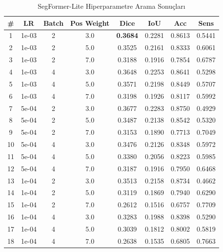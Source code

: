 \begin{table}[htbp]
\centering
\caption{SegFormer-Lite Hiperparametre Arama Sonuçları}
\label{tab:hyperparam_segformer}
\begin{tabular}{cccccccc}
\hline
\textbf{\#} & \textbf{LR} & \textbf{Batch} & \textbf{Pos Weight} & \textbf{Dice} & \textbf{IoU} & \textbf{Acc} & \textbf{Sens} \\
\hline
1 & 1e-03 & 2 & 3.0 & \textbf{0.3684} & 0.2281 & 0.8613 & 0.5441 \\
2 & 1e-03 & 2 & 5.0 & 0.3525 & 0.2161 & 0.8333 & 0.6061 \\
3 & 1e-03 & 2 & 7.0 & 0.3188 & 0.1916 & 0.7854 & 0.6787 \\
4 & 1e-03 & 4 & 3.0 & 0.3648 & 0.2253 & 0.8641 & 0.5298 \\
5 & 1e-03 & 4 & 5.0 & 0.3571 & 0.2198 & 0.8449 & 0.5707 \\
6 & 1e-03 & 4 & 7.0 & 0.3198 & 0.1926 & 0.8117 & 0.5992 \\
7 & 5e-04 & 2 & 3.0 & 0.3677 & 0.2283 & 0.8750 & 0.4929 \\
8 & 5e-04 & 2 & 5.0 & 0.3487 & 0.2138 & 0.8542 & 0.5320 \\
9 & 5e-04 & 2 & 7.0 & 0.3153 & 0.1890 & 0.7713 & 0.7049 \\
10 & 5e-04 & 4 & 3.0 & 0.3476 & 0.2126 & 0.8348 & 0.5972 \\
11 & 5e-04 & 4 & 5.0 & 0.3380 & 0.2056 & 0.8223 & 0.5985 \\
12 & 5e-04 & 4 & 7.0 & 0.3187 & 0.1916 & 0.7950 & 0.6468 \\
13 & 1e-04 & 2 & 3.0 & 0.3513 & 0.2158 & 0.8734 & 0.4662 \\
14 & 1e-04 & 2 & 5.0 & 0.3119 & 0.1869 & 0.7940 & 0.6290 \\
15 & 1e-04 & 2 & 7.0 & 0.2612 & 0.1516 & 0.6757 & 0.7709 \\
16 & 1e-04 & 4 & 3.0 & 0.3283 & 0.1988 & 0.8398 & 0.5290 \\
17 & 1e-04 & 4 & 5.0 & 0.3039 & 0.1812 & 0.8002 & 0.5819 \\
18 & 1e-04 & 4 & 7.0 & 0.2638 & 0.1535 & 0.6805 & 0.7663 \\
\hline
\end{tabular}
\end{table}

